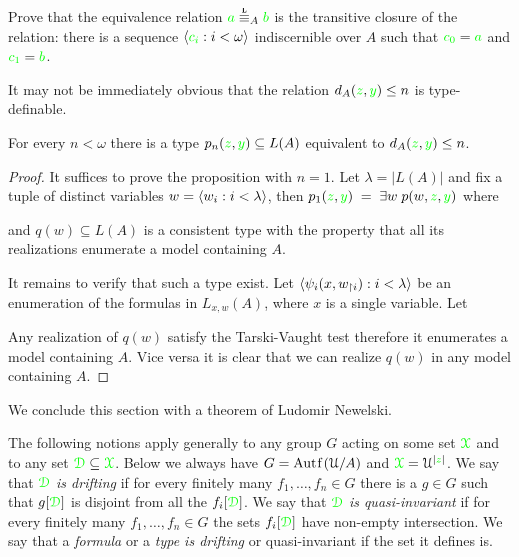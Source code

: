\documentclass[creche.tex]{subfiles}
\begin{document}
\begin{exercise}
  Prove that the equivalence relation ${\gr a}\stackrel{\smash{\scalebox{.5}{\rm\bf L}}}{\equiv}_A{\gr b}$ is the transitive closure of the relation: there is a sequence $\langle{\color{green}c_i}:i<\omega\rangle$ indiscernible over $A$ such that ${\color{green} c_0}={\color{green} a}$ and ${\color{green} c_1}={\color{green} b}$.\QED
\end{exercise}

It may not be immediately obvious that the relation $d_A({\color{green} z},{\color{green} y})\le n$ is type-definable. 

\begin{proposition}\label{prop_Lascar_distance_type_def}
For every $n<\omega$ there is a type $p_n({\color{green} z},{\color{green} y})\subseteq L(A)$ equivalent to $d_A({\color{green} z},{\color{green} y})\le n$.  
\end{proposition}
\begin{proof}
It suffices to prove the proposition with $n=1$. Let $\lambda=|L(A)|$ and fix a tuple of distinct variables $w=\langle w_i:i<\lambda\rangle$, then $p_1({\color{green} z},{\color{green} y})\;=\;\exists w\;p(w,{\color{green} z},{\color{green} y})$ where


and $q(w)\subseteq L(A)$ is a consistent type with the property that all its realizations enumerate a model containing $A$.

It remains to verify that such a type exist. Let $\langle\psi_i(x,w_{\restriction i}):i<\lambda\rangle$ be an enumeration of the formulas in $L_{x,w}(A)$, where $x$ is a single variable. Let 


Any realization of $q(w)$ satisfy the Tarski-Vaught test therefore it enumerates a model containing $A$. Vice versa it is clear that we can realize $q(w)$ in any model containing $A$.
\end{proof}

We conclude this section with a theorem of Ludomir Newelski. 

The following notions apply generally to any group $G$ acting on some set ${\color{green}\EuScript X}$ and to any set ${\color{green}\EuScript D}\subseteq {\color{green}\EuScript X}$. Below we always have $G=\mathord{\rm Aut\kern.15ex{f}\kern.15ex}(\EuScript U/A)$ and ${\color{green}\EuScript X}=\EuScript U^{|{\color{green} z}|}$.  We say that ${\color{green}\EuScript D}$ \emph{is drifting\/} if for every finitely many $f_1,\dots,f_n\in G$ there is a $g\in G$ such that $g[{\color{green}\EuScript D}]$ is disjoint from all the $f_i[{\color{green}\EuScript D}]$. We say that ${\color{green}\EuScript D}$ \emph{is quasi-invariant\/} if for every finitely many $f_1,\dots,f_n\in G$ the sets  $f_i[{\color{green}\EuScript D}]$ have non-empty intersection. We say that a \emph{formula\/} or a \emph{type is drifting\/} or quasi-invariant if the set it defines is.
\end{document}
